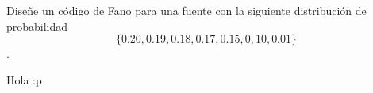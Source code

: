 
Diseñe un código de Fano para una fuente con la siguiente distribución de probabilidad $$\{0.20, 0.19, 0.18, 0.17, 0.15, 0,10, 0.01\}$$.
\begin{sol}
    Hola :p
\end{sol}